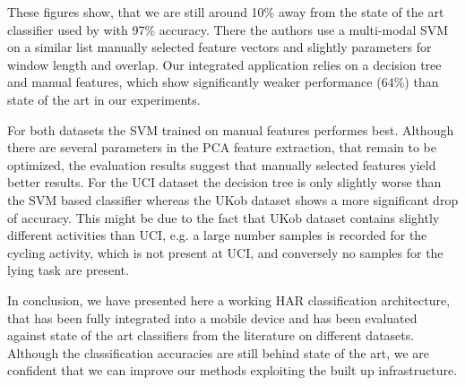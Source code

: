 These figures show, that we are still around 10\% away from the state
of the art classifier used by \cite{Anguita} with 97\% accuracy. There
the authors use a multi-modal SVM on a similar list manually selected
feature vectors and slightly parameters for window length and overlap.
Our integrated application relies on a decision tree and manual
features, which show significantly weaker performance (64\%) than
state of the art in our experiments.

For both datasets the SVM trained on manual features performes best.
Although there are several parameters in the PCA feature extraction,
that remain to be optimized, the evaluation results suggest that
manually selected features yield better results.  For the UCI dataset
the decision tree is only slightly worse than the SVM based classifier
whereas the UKob dataset shows a more significant drop of
accuracy. This might be due to the fact that UKob dataset contains
slightly different activities than UCI, e.g. a large number samples is
recorded for the cycling activity, which is not present at UCI, and
conversely no samples for the lying task are present.


In conclusion, we have presented here a working HAR classification
architecture, that has been fully integrated into a mobile device and
has been evaluated against state of the art classifiers from the
literature on different datasets. Although the classification
accuracies are still behind state of the art, we are confident that we
can improve our methods exploiting the built up infrastructure.

% 


